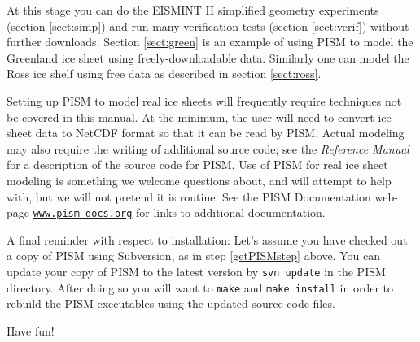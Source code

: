 \documentclass[11pt,final]{amsart}
\renewcommand{\t}[1]{\texttt{#1}}
\begin{document}
\smallskip

At this stage you can do the EISMINT II simplified geometry experiments (section \ref{sect:simp}) and run many verification tests (section \ref{sect:verif}) without further downloads.  Section \ref{sect:green} is an example of using PISM to model the Greenland ice sheet using freely-downloadable data.  Similarly one can model the Ross ice shelf using free data as described in section \ref{sect:ross}.

Setting up PISM to model real ice sheets will frequently require techniques not be covered in this manual.  At the minimum, the user will need to convert ice sheet data to NetCDF format so that it can be read by PISM.  Actual modeling may also require the writing of additional source code; see the \emph{Reference Manual} for a description of the source code for PISM.  Use of PISM for real ice sheet modeling is something we welcome questions about, and will attempt to help with, but we will not pretend it is routine.  See the PISM Documentation web-page \href{http://www.pism-docs.org/}{\t{www.pism-docs.org}} for links to additional documentation.

A final reminder with respect to installation:  Let's assume you have checked out a copy of PISM using Subversion, as in step \ref{getPISMstep} above.   You can update your copy of PISM to the latest version by \verb|svn update| in the PISM directory.  After doing so you will want to \verb|make| and \verb|make install| in order to rebuild the PISM executables using the updated source code files.

Have fun!
\end{document}
